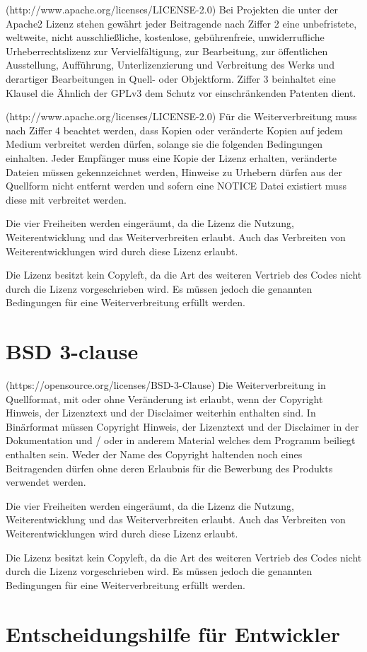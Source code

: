 (http://www.apache.org/licenses/LICENSE-2.0) Bei Projekten die unter der Apache2 Lizenz stehen gew\"ahrt jeder Beitragende nach Ziffer 2 eine unbefristete, weltweite, nicht ausschließliche, kostenlose, gebührenfreie, unwiderrufliche Urheberrechtslizenz zur Vervielfältigung, zur Bearbeitung, zur öffentlichen Ausstellung, Aufführung, Unterlizenzierung und Verbreitung des Werks und derartiger Bearbeitungen in Quell- oder Objektform. Ziffer 3 beinhaltet eine Klausel die \"Ahnlich der GPLv3 dem Schutz vor einschr\"ankenden Patenten dient. 

(http://www.apache.org/licenses/LICENSE-2.0) F\"ur die Weiterverbreitung muss nach Ziffer 4 beachtet werden, dass Kopien oder veränderte Kopien auf jedem Medium verbreitet werden d\"urfen, solange sie die folgenden Bedingungen einhalten. Jeder Empf\"anger muss eine Kopie der Lizenz erhalten, ver\"anderte Dateien m\"ussen gekennzeichnet werden, Hinweise zu Urhebern d\"urfen aus der Quellform nicht entfernt werden und sofern eine NOTICE Datei existiert muss diese mit verbreitet werden. 

Die vier Freiheiten werden einger\"aumt, da die Lizenz die Nutzung, Weiterentwicklung und das Weiterverbreiten erlaubt. Auch das Verbreiten von Weiterentwicklungen wird durch diese Lizenz erlaubt.

Die Lizenz besitzt kein Copyleft, da die Art des weiteren Vertrieb des Codes nicht durch die Lizenz vorgeschrieben wird. Es m\"ussen jedoch die genannten Bedingungen f\"ur eine Weiterverbreitung erf\"ullt werden.

\section{BSD 3-clause}

(https://opensource.org/licenses/BSD-3-Clause) Die Weiterverbreitung in Quellformat, mit oder ohne Ver\"anderung ist erlaubt, wenn der Copyright Hinweis, der Lizenztext und der Disclaimer weiterhin enthalten sind. In Bin\"arformat m\"ussen Copyright Hinweis, der Lizenztext und der Disclaimer in der Dokumentation und / oder in anderem Material welches dem Programm beiliegt enthalten sein. Weder der Name des Copyright haltenden noch eines Beitragenden d\"urfen ohne deren Erlaubnis f\"ur die Bewerbung des Produkts verwendet werden.

Die vier Freiheiten werden einger\"aumt, da die Lizenz die Nutzung, Weiterentwicklung und das Weiterverbreiten erlaubt. Auch das Verbreiten von Weiterentwicklungen wird durch diese Lizenz erlaubt.

Die Lizenz besitzt kein Copyleft, da die Art des weiteren Vertrieb des Codes nicht durch die Lizenz vorgeschrieben wird. Es m\"ussen jedoch die genannten Bedingungen f\"ur eine Weiterverbreitung erf\"ullt werden.

\section{Entscheidungshilfe f\"ur Entwickler}
